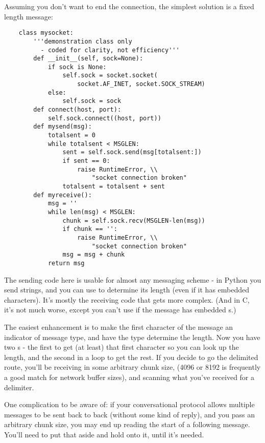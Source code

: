 \documentclass{howto}
\begin{document}
Assuming you don't want to end the connection, the simplest solution
is a fixed length message:

\begin{verbatim}
    class mysocket:
        '''demonstration class only 
          - coded for clarity, not efficiency'''
        def __init__(self, sock=None):
            if sock is None:
                self.sock = socket.socket(
                    socket.AF_INET, socket.SOCK_STREAM)
            else:
                self.sock = sock
        def connect(host, port):
            self.sock.connect((host, port))
        def mysend(msg):
            totalsent = 0
            while totalsent < MSGLEN:
                sent = self.sock.send(msg[totalsent:])
                if sent == 0:
                    raise RuntimeError, \\
                        "socket connection broken"
                totalsent = totalsent + sent
        def myreceive():
            msg = ''
            while len(msg) < MSGLEN:
                chunk = self.sock.recv(MSGLEN-len(msg))
                if chunk == '':
                    raise RuntimeError, \\
                        "socket connection broken"
                msg = msg + chunk
            return msg
\end{verbatim}

The sending code here is usable for almost any messaging scheme - in
Python you send strings, and you can use  to
determine its length (even if it has embedded 
characters). It's mostly the receiving code that gets more
complex. (And in C, it's not much worse, except you can't use
 if the message has embedded s.)

The easiest enhancement is to make the first character of the message
an indicator of message type, and have the type determine the
length. Now you have two s - the first to get (at
least) that first character so you can look up the length, and the
second in a loop to get the rest. If you decide to go the delimited
route, you'll be receiving in some arbitrary chunk size, (4096 or 8192
is frequently a good match for network buffer sizes), and scanning
what you've received for a delimiter.

One complication to be aware of: if your conversational protocol
allows multiple messages to be sent back to back (without some kind of
reply), and you pass  an arbitrary chunk size, you
may end up reading the start of a following message. You'll need to
put that aside and hold onto it, until it's needed.
\end{document}
